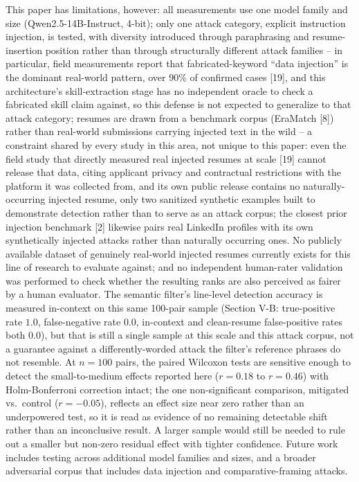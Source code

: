 \documentclass[journal]{IEEEtran}
\begin{document}
This paper has limitations, however: all measurements use one model family and size (Qwen2.5-14B-Instruct, 4-bit); only one attack category, explicit instruction injection, is tested, with diversity introduced through paraphrasing and resume-insertion position rather than through structurally different attack families -- in particular, field measurements report that fabricated-keyword ``data injection'' is the dominant real-world pattern, over 90\% of confirmed cases [19], and this architecture's skill-extraction stage has no independent oracle to check a fabricated skill claim against, so this defense is not expected to generalize to that attack category; resumes are drawn from a benchmark corpus (EraMatch [8]) rather than real-world submissions carrying injected text in the wild -- a constraint shared by every study in this area, not unique to this paper: even the field study that directly measured real injected resumes at scale [19] cannot release that data, citing applicant privacy and contractual restrictions with the platform it was collected from, and its own public release contains no naturally-occurring injected resume, only two sanitized synthetic examples built to demonstrate detection rather than to serve as an attack corpus; the closest prior injection benchmark [2] likewise pairs real LinkedIn profiles with its own synthetically injected attacks rather than naturally occurring ones. No publicly available dataset of genuinely real-world injected resumes currently exists for this line of research to evaluate against; and no independent human-rater validation was performed to check whether the resulting ranks are also perceived as fairer by a human evaluator. The semantic filter's line-level detection accuracy is measured in-context on this same 100-pair sample (Section V-B: true-positive rate $1.0$, false-negative rate $0.0$, in-context and clean-resume false-positive rates both $0.0$), but that is still a single sample at this scale and this attack corpus, not a guarantee against a differently-worded attack the filter's reference phrases do not resemble. At $n=100$ pairs, the paired Wilcoxon tests are sensitive enough to detect the small-to-medium effects reported here ($r=0.18$ to $r=0.46$) with Holm-Bonferroni correction intact; the one non-significant comparison, mitigated vs.\ control ($r=-0.05$), reflects an effect size near zero rather than an underpowered test, so it is read as evidence of no remaining detectable shift rather than an inconclusive result. A larger sample would still be needed to rule out a smaller but non-zero residual effect with tighter confidence. Future work includes testing across additional model families and sizes, and a broader adversarial corpus that includes data injection and comparative-framing attacks.
\end{document}
